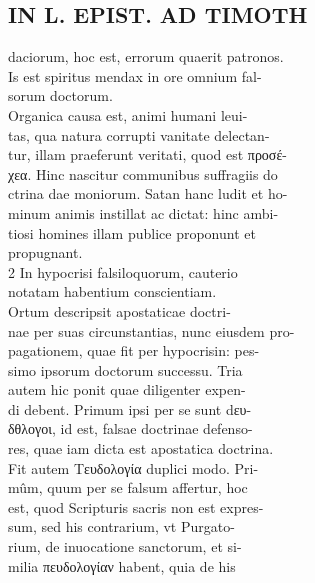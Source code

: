 \documentclass{article}
\begin{document}
\begin{pages}
\section*{IN L. EPIST. AD TIMOTH \\
                }
daciorum, hoc est, errorum quaerit patronos. \\
                Is est spiritus mendax in ore omnium fal- \\
                sorum doctorum. \\
                Organica causa est, animi humani leui- \\
                tas, qua natura corrupti vanitate delectan- \\
                tur, illam praeferunt veritati, quod est προσέ- \\
                χεα. Hinc nascitur communibus suffragiis do \\
                ctrina dae moniorum. Satan hanc ludit et ho- \\
                minum animis instillat ac dictat: hinc ambi- \\
                tiosi homines illam publice proponunt et \\
                propugnant. \\
                2 In hypocrisi falsiloquorum, cauterio \\
                notatam habentium conscientiam. \\
                Ortum descripsit apostaticae doctri- \\
                nae per suas circunstantias, nunc eiusdem pro- \\
                pagationem, quae fit per hypocrisin: pes- \\
                simo ipsorum doctorum successu. Tria \\
                autem hic ponit quae diligenter expen- \\
                di debent. Primum ipsi per se sunt dευ- \\
                δθλογοι, id est, falsae doctrinae defenso- \\
                res, quae iam dicta est apostatica doctrina. \\
                Fit autem Τευδολογία duplici modo. Pri- \\
                mûm, quum per se falsum affertur, hoc \\
                est, quod Scripturis sacris non est expres- \\
                sum, sed his contrarium, vt Purgato- \\
                rium, de inuocatione sanctorum, et si- \\
                milia πευδολογίαν habent, quia de his \\
                

\end{pages}
\end{document}
